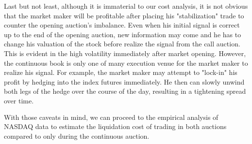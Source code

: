 Last but not least, although it is immaterial to our cost analysis, it is not obvious that the market maker will be profitable after placing his "stabilization" trade to counter the opening auction's imbalance. Even when his initial signal is correct up to the end of the opening auction, new information may come and he has to change his valuation of the stock before realize the signal from the call auction. This is evident in the high volatility immediately after market opening. However, the continuous book is only one of many execution venue for the market maker to realize his signal. For example, the market maker may attempt to "lock-in" his profit by hedging into the index futures immediately. He then can slowly unwind both legs of the hedge over the course of the day, resulting in a tightening spread over time.

With those caveats in mind, we can proceed to the empirical analysis of NASDAQ data to estimate the liquidation cost of trading in both auctions compared to only during the continuous auction.